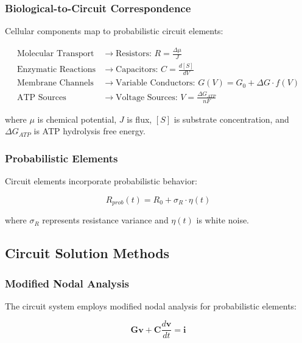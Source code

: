 \documentclass[12pt,a4paper]{article}
\begin{document}
\subsubsection{Biological-to-Circuit Correspondence}

Cellular components map to probabilistic circuit elements:

\begin{align}
\text{Molecular Transport} &\rightarrow \text{Resistors: } R = \frac{\Delta \mu}{J} \\
\text{Enzymatic Reactions} &\rightarrow \text{Capacitors: } C = \frac{d[S]}{dV} \\
\text{Membrane Channels} &\rightarrow \text{Variable Conductors: } G(V) = G_0 + \Delta G \cdot f(V) \\
\text{ATP Sources} &\rightarrow \text{Voltage Sources: } V = \frac{\Delta G_{ATP}}{nF}
\end{align}

where $\mu$ is chemical potential, $J$ is flux, $[S]$ is substrate concentration, and $\Delta G_{ATP}$ is ATP hydrolysis free energy.

\subsubsection{Probabilistic Elements}

Circuit elements incorporate probabilistic behavior:

\begin{equation}
R_{prob}(t) = R_0 + \sigma_R \cdot \eta(t)
\end{equation}

where $\sigma_R$ represents resistance variance and $\eta(t)$ is white noise.

\subsection{Circuit Solution Methods}

\subsubsection{Modified Nodal Analysis}

The circuit system employs modified nodal analysis for probabilistic elements:

\begin{equation}
\mathbf{G}\mathbf{v} + \mathbf{C}\frac{d\mathbf{v}}{dt} = \mathbf{i}
\end{equation}
\end{document}
